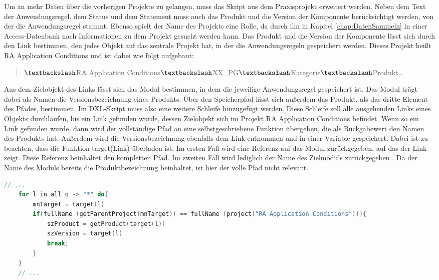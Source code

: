 Um an mehr Daten über die vorherigen Projekte zu gelangen, muss das Skript aus dem Praxisprojekt erweitert werden. Neben dem Text der Anwendungsregel, dem Status und dem Statement
muss auch das Produkt und die Version der Komponente berücksichtigt werden, von der die Anwendungsregel stammt. Ebenso spielt der Name des Projekts eine Rolle,
da durch ihn in Kapitel \ref*{chap:DatenSammeln} in einer Access-Datenbank nach Informationen zu dem Projekt gesucht werden kann. 
Das Produkt und die Version der Komponente lässt sich durch den Link bestimmen, den jedes Objekt auf das zentrale Projekt hat, in der die Anwendungsregeln gespeichert werden.
Dieses Projekt heißt RA Application Conditions und ist dabei wie folgt aufgebaut:

\begin{quotation}
    $\textbackslash$RA Application Conditions$\textbackslash$XX\_PG$\textbackslash$Kategorie$\textbackslash$Produkt\dots
\end{quotation}

Aus dem Zielobjekt des Links lässt sich das Modul bestimmen, in dem die jeweilige Anwendungsregel gespeichert ist. Das Modul trägt dabei als Namen die Versionsbezeichnung eines Produkts.
Über den Speicherpfad lässt sich außerdem das Produkt, als das dritte Element des Pfades, bestimmen. Im \ac{DXL}-Skript muss also eine weitere Schleife hinzugefügt werden.
Diese Schleife soll alle ausgehenden Links eines Objekts durchlaufen, bis ein Link gefunden wurde, dessen Zielobjekt sich im Projekt RA Application Conditions befindet.
Wenn so ein Link gefunden wurde, dann wird der vollständige Pfad an eine selbstgeschriebene Funktion übergeben, die als Rückgabewert den Namen des Produkts hat.
Außerdem wird die Versionsbezeichnung ebenfalls dem Link entnommen und in einer Variable gespeichert. Dabei ist zu beachten, dass die Funktion target(Link) überladen ist.
Im ersten Fall wird eine Referenz auf das Modul zurückgegeben, auf das der Link zeigt. Diese Referenz beinhaltet den kompletten Pfad. Im zweiten Fall wird lediglich der Name des Zielmoduls 
zurückgegeben \cite[vgl. S.391]{DXL}. Da der Name des Moduls bereits die Produktbezeichnung beinhaltet, ist hier der volle Pfad nicht relevant.

\begin{lstlisting}[language = C++, caption={Produkt- und Versionsbezeichnung bestimmen},captionpos=b, label = lst:getProductVersion, float, floatplacement=H]
    // ...
    for l in all o -> "*" do{
        mnTarget = target(l)
        if(fullName (getParentProject(mnTarget)) == fullName (project("RA Application Conditions"))){
            szProduct = getProduct(target(l)) 
            szVersion = target(l)
            break;
        } 
    }
    // ...
\end{lstlisting}

